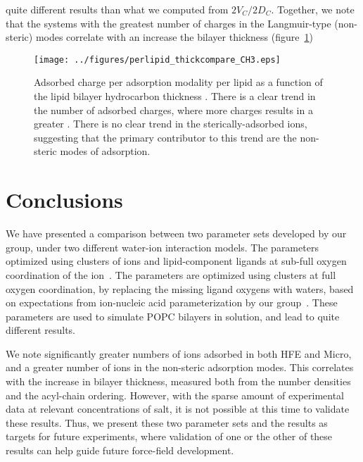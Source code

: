 quite different results than what we computed from $2V_C/2D_C$.
Together, we note that the systems with the greatest number of charges in the Langmuir-type (non-steric) modes correlate with an increase the
bilayer thickness (figure~\ref{fig:chargeperlipid})
\begin{figure}[h!]
    \caption[Adsorbed charge per mode per lipid]{Adsorbed charge per adsorption modality per lipid as a function of the lipid bilayer hydrocarbon thickness \dc{}. There is a clear trend in the number of adsorbed
        charges, where more charges results in a greater \dc{}. There is no clear trend in the sterically-adsorbed ions, suggesting that the primary contributor to this trend are
the non-steric modes of adsorption.}
    \label{fig:chargeperlipid}
    \texttt{[image: ../figures/perlipid\_thickcompare\_CH3.eps]}
\end{figure}
\section{Conclusions}
We have presented a comparison between two \mg{} parameter sets developed by our group, under two different water-ion interaction models. The  parameters
optimized using clusters of ions and lipid-component ligands at sub-full oxygen coordination of the ion~\cite{saunders:2024}. The  parameters are
optimized using clusters at full oxygen coordination, by replacing the missing ligand oxygens with waters, based on expectations from ion-nucleic acid parameterization
by our group~\cite{julian:2023:mg}. These parameters are used to simulate POPC bilayers in \mgcl{} solution, and lead to quite different results.

We note significantly greater numbers of ions adsorbed in both  HFE and Micro, and a greater number of ions in the non-steric adsorption modes. This correlates
with the increase in bilayer thickness, measured both from the number densities and the acyl-chain ordering.
However, with the sparse amount of experimental data at relevant concentrations of salt, it is not possible at this time to validate these results. Thus, we present
these two parameter sets and the results as targets for future experiments, where validation of one or the other of these results can help guide future force-field
development.


